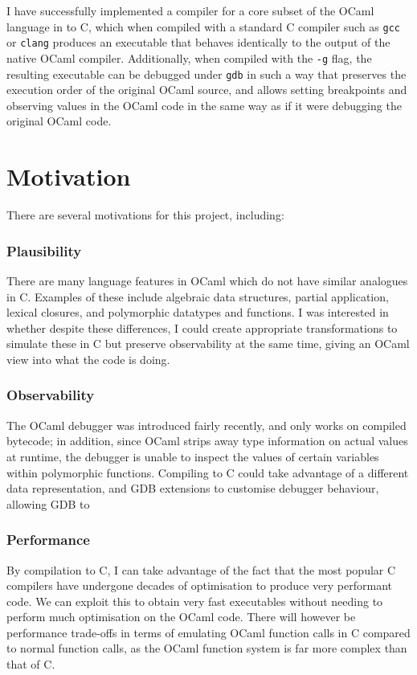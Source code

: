 \documentclass[12pt,a4paper,twoside,openright]{report}
\begin{document}
I have successfully implemented a compiler for a core subset of the OCaml language in to C, which when compiled with a standard C compiler such as \texttt{gcc} or \texttt{clang} produces an executable that behaves identically to the output of the native OCaml compiler. Additionally, when compiled with the \texttt{-g} flag, the resulting executable can be debugged under \texttt{gdb} in such a way that preserves the execution order of the original OCaml source, and allows setting breakpoints and observing values in the OCaml code in the same way as if it were debugging the original OCaml code.

\section{Motivation}

There are several motivations for this project, including:

\subsubsection{Plausibility}
There are many language features in OCaml which do not have similar analogues in C. Examples of these include algebraic data structures, partial application, lexical closures, and polymorphic datatypes and functions. I was interested in whether despite these differences, I could create appropriate transformations to simulate these in C but preserve observability at the same time, giving an OCaml view into what the code is doing.

\subsubsection{Observability}

The OCaml debugger was introduced fairly recently, and only works on compiled 
bytecode; in addition, since OCaml strips away type information on actual 
values at runtime, the debugger is unable to inspect the values of certain 
variables within polymorphic functions. Compiling to C could take advantage of 
a different data representation, and GDB extensions to customise debugger 
behaviour, allowing GDB to 

\subsubsection{Performance}

By compilation to C, I can take advantage of the fact that the most popular C 
compilers have undergone decades of optimisation to produce very performant 
code. We can exploit this to obtain very fast executables without needing to 
perform much optimisation on the OCaml code. There will however be performance 
trade-offs in terms of emulating OCaml function calls in C compared to normal 
function calls, as the OCaml function system is far more complex than that of C.
\end{document}
